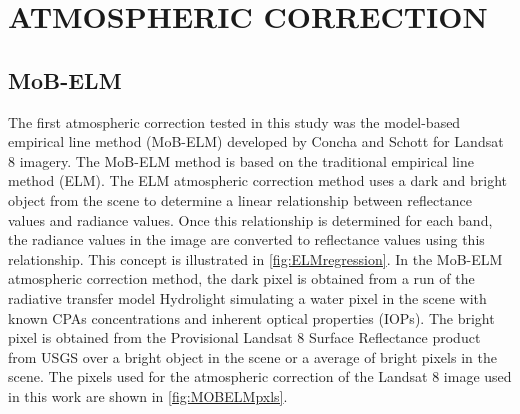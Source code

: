 \documentclass[draft]{spie}  %
\begin{document}
\section{ATMOSPHERIC CORRECTION}
\label{sec:atmcorr}  %
\subsection{MoB-ELM}
The first atmospheric correction tested in this study was the model-based empirical line method (MoB-ELM) developed by Concha and Schott\cite{Concha2014SPIE} for Landsat 8 imagery. The MoB-ELM method is based on the traditional empirical line method (ELM)\cite{Smith:1999,Schott}. The ELM atmospheric correction method uses a dark and bright object from the scene to determine a linear relationship between reflectance values and radiance values. Once this relationship is determined for each band, the radiance values in the image are converted to reflectance values using this relationship. This concept is illustrated in \autoref{fig:ELMregression}. In the MoB-ELM atmospheric correction method, the dark pixel is obtained from a run of the radiative transfer model Hydrolight\cite{MobleyHEtech} simulating a water pixel in the scene with known CPAs concentrations and inherent optical properties (IOPs). The bright pixel is obtained from the Provisional Landsat 8 Surface Reflectance product\cite{L8SurfProduct2015} from USGS over a bright object in the scene or a average of bright pixels in the scene. The pixels used for the atmospheric correction of the Landsat 8 image used in this work are shown in \autoref{fig:MOBELMpxls}.
\end{document}

